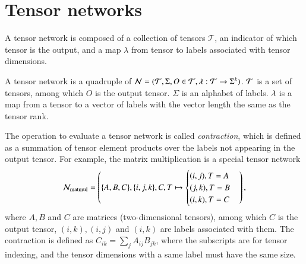 \documentclass[review, onefignum, onetabnum]{siamart190516}
\begin{document}
\section{Tensor networks}\label{sec:tn}
A tensor network is composed of a collection of tensors $\mathcal{T}$, an indicator of which tensor is the output, and a map $\lambda$ from tensor to labels associated with tensor dimensions.
\begin{definition}
    A tensor network is a quadruple of $\mathcal{N} = ({\mathcal{T}}, \Sigma, O \in {\mathcal{T}}, {\lambda} : \mathcal{T} \rightarrow \Sigma^k)$. ${\mathcal{T}}$ is a set of tensors, among which $O$ is the output tensor.
    $\Sigma$ is an alphabet of labels. ${\lambda}$ is a map from a tensor to a vector of labels with the vector length the same as the tensor rank.
\end{definition}
The operation to evaluate a tensor network is called \textit{contraction}, which is defined as a summation of tensor element products over the labels not appearing in the output tensor.
For example, the matrix multiplication is a special tensor network
\begin{equation}
\mathcal{N}_{\rm matmul} = \left(\{A, B, C\}, \{i,j,k\}, C, T \mapsto \begin{cases} (i,j), T = A\\(j, k), T=B\\ (i, k), T=C\end{cases}\right),
\end{equation}
where $A, B$ and $C$ are matrices (two-dimensional tensors), among which $C$ is the output tensor, $(i,k),(i,j)$ and $(i,k)$ are labels associated with them. The contraction is defined as $C_{ik} = \sum_j A_{ij}B_{jk}$, where the subscripts are for tensor indexing, and the tensor dimensions with a same label must have the same size.
\end{document}
